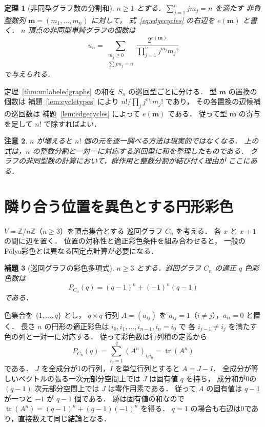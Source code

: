 \documentclass[a5paper,10pt,onecolumn]{jsarticle}
\makeatletter
\theoremstyle{mathnotetheorem}
\newtheorem{theorem}{定理}[section]
\newtheorem{lemma}[theorem]{補題}
\newtheorem{remark}[theorem]{注意}
\renewcommand{\proofname}{証明}
\renewenvironment{proof}[1][\proofname]{%
  \par\pushQED{\qed}\normalfont\topsep4\p@\@plus2\p@\relax
  \trivlist\item[\hskip\labelsep\bfseries #1]\ignorespaces
}{\popQED\endtrivlist\@endpefalse}
\makeatother
\begin{document}
\begin{theorem}[非同型グラフ数の分割和]\label{thm:graphsbytype}
$n\ge1$ とする．$\sum_{j=1}^n jm_j=n$ を満たす
非負整数列 $\mathbf m=(m_1,\ldots,m_n)$ に対して，
式~\eqref{eq:edgecycles} の右辺を $e(\mathbf m)$ と書く．
$n$ 頂点の非同型単純グラフの個数は
\[
 u_n=\sum_{\substack{m_j\ge0\\\sum jm_j=n}}
 \frac{2^{e(\mathbf m)}}{\prod_{j=1}^n j^{m_j}m_j!}
\]
で与えられる．
\end{theorem}
\begin{proof}
定理~\ref{thm:unlabeledgraphs} の和を
$S_n$ の巡回型ごとに分ける．
型 $\mathbf m$ の置換の個数は
補題~\ref{lem:cycletypes} により
$n!/\prod_j j^{m_j}m_j!$ であり，
その各置換の辺候補の巡回数は
補題~\ref{lem:edgecycles} によって $e(\mathbf m)$ である．
従って型 $\mathbf m$ の寄与を足して $n!$ で除すればよい．
\end{proof}

\begin{remark}
$n$ が増えると $n!$ 個の元を逐一調べる方法は現実的ではなくなる．
上の式は，$n$ の整数分割と一対一に対応する巡回型に和を整理したものである．
グラフの非同型数の計算において，群作用と整数分割が結び付く理由が
ここにある．
\end{remark}

\section{隣り合う位置を異色とする円形彩色}
$V=\mathbb Z/n\mathbb Z$（$n\ge3$）を頂点集合とする
巡回グラフ $C_n$ を考える．
各 $x$ と $x+1$ の間に辺を置く．
位置の対称性と適正彩色条件を組み合わせると，
一般のP\'olya彩色とは異なる固定点計算が必要になる．

\begin{lemma}[巡回グラフの彩色多項式]\label{lem:cyclechromatic}
$n\ge3$ とする．巡回グラフ $C_n$ の適正 $q$ 色彩色数は
\begin{equation}\label{eq:chromaticcycle}
 P_{C_n}(q)=(q-1)^n+(-1)^n(q-1)
\end{equation}
である．
\end{lemma}
\begin{proof}
色集合を $\{1,\ldots,q\}$ とし，
$q\times q$ 行列 $A=(a_{ij})$ を
$a_{ij}=1$（$i\ne j$），$a_{ii}=0$ と置く．
長さ $n$ の円形の適正彩色は
$i_0,i_1,\ldots,i_{n-1},i_n=i_0$ で
各 $i_{j-1}\ne i_j$ を満たす色の列と一対一に対応する．
従って彩色数は行列積の定義から
\[
 P_{C_n}(q)=\sum_{i_0=1}^q(A^n)_{i_0i_0}
 =\operatorname{tr}(A^n)
\]
である．
$J$ を全成分が1の行列，$I$ を単位行列とすると
$A=J-I$．
全成分が等しいベクトルの張る一次元部分空間上では
$J$ は固有値 $q$ を持ち，
成分和が0の $(q-1)$ 次元部分空間上では
$J$ は零作用素である．
従って $A$ の固有値は $q-1$ が一つと
$-1$ が $q-1$ 個である．
跡は固有値の和なので
$\operatorname{tr}(A^n)=(q-1)^n+(q-1)(-1)^n$ を得る．
$q=1$ の場合も右辺は0であり，直接数えて同じ結論となる．
\end{proof}
\end{document}
